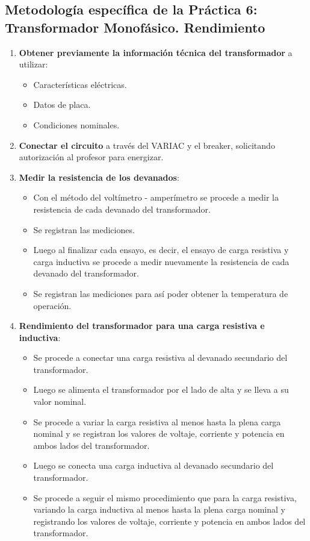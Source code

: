 \documentclass[12pt]{article}
\begin{document}
\subsection*{Metodolog\'ia espec\'ifica de la Pr\'actica 6: Transformador Monof\'asico. Rendimiento}
\begin{enumerate}
    \item \textbf{Obtener previamente la informaci\'on t\'ecnica del transformador} a utilizar:
    \begin{itemize}
        \item Caracter\'isticas el\'ectricas.
        \item Datos de placa.
        \item Condiciones nominales.
    \end{itemize}
    \item \textbf{Conectar el circuito} a trav\'es del VARIAC y el breaker, solicitando autorizaci\'on al profesor para energizar.
    \item \textbf{Medir la resistencia de los devanados}:
    \begin{itemize}
        \item Con el m\'etodo del volt\'imetro - amper\'imetro se procede a medir la resistencia de cada devanado del transformador.
        \item Se registran las mediciones.
        \item Luego al finalizar cada ensayo, es decir, el ensayo de carga resistiva y carga inductiva se procede a medir nuevamente la resistencia de cada devanado del transformador.
        \item Se registran las mediciones para as\'i poder obtener la temperatura de operaci\'on.
    \end{itemize}
    \item \textbf{Rendimiento del transformador para una carga resistiva e inductiva}:
    \begin{itemize} 
        \item Se procede a conectar una carga resistiva al devanado secundario del transformador.
        \item Luego se alimenta el transformador por el lado de alta y se lleva a su valor nominal.
        \item Se procede a variar la carga resistiva al menos hasta la plena carga nominal y se registran los valores de voltaje, corriente y potencia en ambos lados del transformador.
        \item Luego se conecta una carga inductiva al devanado secundario del transformador.
        \item Se procede a seguir el mismo procedimiento que para la carga resistiva, variando la carga inductiva al menos hasta la plena carga nominal y registrando los valores de voltaje, corriente y potencia en ambos lados del transformador.
    \end{itemize}
\end{enumerate}
\newpage
\end{document}
